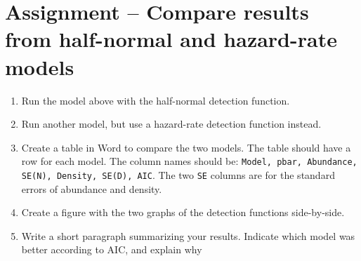\documentclass[12pt]{article}\usepackage[]{graphicx}\usepackage[]{color}
\begin{document}
\section*{Assignment -- Compare results from half-normal and hazard-rate models}

\begin{enumerate}
  \item Run the model above with the half-normal detection function.
  \item Run another model, but use a hazard-rate detection function
    instead.  
  \item Create a table in Word to compare the two models. The table
    should have a row for each model. The column names should be:
    \texttt{Model, pbar, Abundance, SE(N), Density, SE(D), AIC}.
    The two \verb+SE+ columns are for the standard errors of
    abundance and density. 
  \item Create a figure with the two graphs of the detection functions
    side-by-side.
  \item Write a short paragraph summarizing your results. Indicate
    which model was better according to AIC, and explain why 
\end{enumerate}
\end{document}
